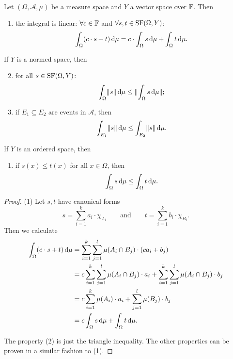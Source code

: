 \begin{proposition} \label{integrationLinear} \label{integrationOrderPreserving}
Let $(\Omega, \mathcal{A}, \mu)$ be a measure space and $Y$ a vector space over $\mathbb{F}$. Then
\begin{enumerate}
\item the integral is linear: $\forall c\in \mathbb{F}$ and $\forall s,t\in\operatorname{SF}(\Omega, Y)$:
\[ \int_\Omega (c\cdot s + t)\operatorname{d \!}{\mu} = c\cdot \int_\Omega s\operatorname{d \!}{\mu} + \int_\Omega t\operatorname{d \!}{\mu}. \]
\end{enumerate}
If $Y$ is a normed space, then
\begin{enumerate} \setcounter{enumi}{1}
\item for all $s\in\operatorname{SF}(\Omega, Y)$:
\[ \int_\Omega \lVert s\rVert\operatorname{d \!}{\mu} \leq \lVert\int_\Omega s \operatorname{d \!}{\mu}\rVert; \]
\item if $E_1\subseteq E_2$ are events in $\mathcal{A}$, then
\[ \int_{E_1}\lVert s\rVert\operatorname{d \!}{\mu} \leq \int_{E_2}\lVert s\rVert\operatorname{d \!}{\mu}. \]
\end{enumerate} \setcounter{enumi}{3}
If $Y$ is an ordered space, then
\begin{enumerate}
\item if $s(x)\leq t(x)$ for all $x\in\Omega$, then
\[ \int_\Omega s\operatorname{d \!}{\mu} \leq \int_\Omega t\operatorname{d \!}{\mu}. \]
\end{enumerate}
\end{proposition}
\begin{proof}
(1) Let $s,t$ have canonical forms
\[ s = \sum_{i=1}^k a_i\cdot\chi_{A_i} \qquad\text{and}\qquad t = \sum_{i=1}^k b_i\cdot\chi_{B_i}. \]
Then we calculate
\begin{align*}
\int_\Omega (c\cdot s + t)\operatorname{d \!}{\mu} &= \sum_{i=1}^k\sum_{j=1}^l\mu(A_i\cap B_j)\cdot(c a_i + b_j) \\
&= c\sum_{i=1}^k\sum_{j=1}^l\mu(A_i\cap B_j)\cdot a_i +  \sum_{i=1}^k\sum_{j=1}^l\mu(A_i\cap B_j) \cdot b_j \\
&= c\sum_{i=1}^k\mu(A_i)\cdot a_i +  \sum_{j=1}^l\mu(B_j) \cdot b_j \\
&= c\int_\Omega s\operatorname{d \!}{\mu} + \int_\Omega t\operatorname{d \!}{\mu}.
\end{align*}

The property (2) is just the triangle inequality. The other properties can be proven in a similar fashion to (1).
\end{proof}

